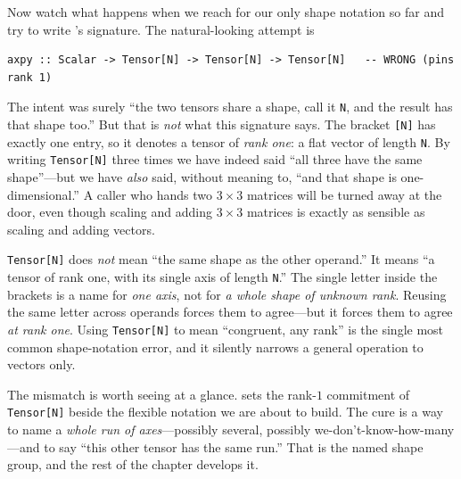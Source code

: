 Now watch what happens when we reach for our only shape notation so far and
try to write 's signature. The natural-looking attempt is
\begin{lstlisting}[style=l4style]
axpy :: Scalar -> Tensor[N] -> Tensor[N] -> Tensor[N]   -- WRONG (pins rank 1)
\end{lstlisting}
The intent was surely ``the two tensors share a shape, call it \texttt{N}, and
the result has that shape too.'' But that is \emph{not} what this signature
says. The bracket \lstinline[style=l4style]|[N]| has exactly one entry, so it
denotes a tensor of \emph{rank one}: a flat vector of length \texttt{N}. By
writing \lstinline[style=l4style]|Tensor[N]| three times we have indeed said
``all three have the same shape''---but we have \emph{also} said, without
meaning to, ``and that shape is one-dimensional.'' A caller who hands
 two $3\times 3$ matrices will be turned away at the door, even
though scaling and adding $3\times 3$ matrices is exactly as sensible as
scaling and adding vectors.

\begin{pitfall}
\lstinline[style=l4style]|Tensor[N]| does \emph{not} mean ``the same shape as
the other operand.'' It means ``a tensor of rank one, with its single axis of
length \texttt{N}.'' The single letter inside the brackets is a name for
\emph{one axis}, not for \emph{a whole shape of unknown rank}. Reusing the
same letter across operands forces them to agree---but it forces them to agree
\emph{at rank one}. Using \lstinline[style=l4style]|Tensor[N]| to mean
``congruent, any rank'' is the single most common shape-notation error, and it
silently narrows a general operation to vectors only.
\end{pitfall}

The mismatch is worth seeing at a glance.
 sets the rank-$1$ commitment of
\lstinline[style=l4style]|Tensor[N]| beside the flexible notation we are about
to build. The cure is a way to name a \emph{whole run of axes}---possibly
several, possibly we-don't-know-how-many---and to say ``this other tensor has
the same run.'' That is the named shape group, and the rest of the chapter
develops it.


